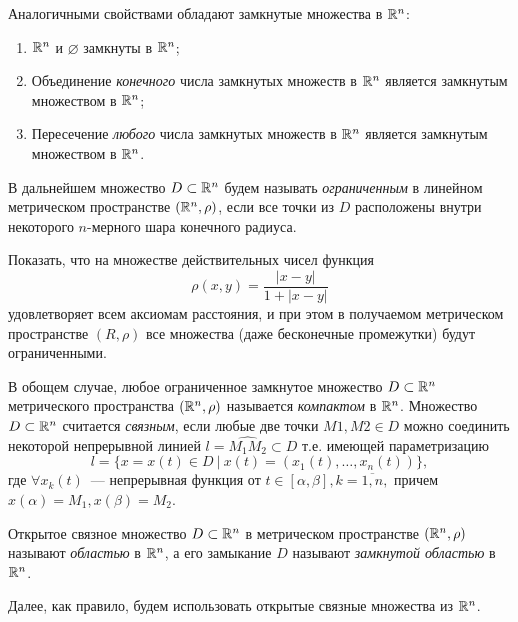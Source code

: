 \documentclass[../../main.tex]{subfiles}
\begin{document}
  Аналогичными свойствами обладают замкнутые множества в $\mathbb{R}^n$:
  \begin{enumerate}
    \item  $\mathbb{R}^n$  и $\varnothing$ замкнуты в $\mathbb{R}^n$;
    \item Объединение \emph{конечного}  числа замкнутых множеств в 
    $\mathbb{R}^n$ является замкнутым множеством в $\mathbb{R}^n$; 
    \item Пересечение \emph{любого} числа замкнутых множеств в $\mathbb{R}^n$ 
    является замкнутым множеством в $\mathbb{R}^n$.
  \end{enumerate} 
  
  
  В дальнейшем множество $D \subset \mathbb{R}^n$ будем называть 
  \emph{ограниченным} в линейном метрическом пространстве $ (\mathbb{R}^n, \rho) $, 
  если все точки из $D$ расположены внутри некоторого $n$-мерного шара 
  конечного радиуса.
  
  \begin{exc}
    Показать, что на множестве действительных чисел функция 
    \[ 
      \rho(x, y) = \frac{|x - y|}{1 + |x - y|}
    \] удовлетворяет всем аксиомам расстояния, и при этом в 
    получаемом метрическом пространстве $ (R, \rho) $ все множества 
    (даже бесконечные промежутки) будут ограниченными.   
   \end{exc} 
 
  \smallskip   
  В обощем случае, любое ограниченное замкнутое множество $D \subset 
  \mathbb{R}^n$ метрического пространства $ (\mathbb{R}^n, \rho) $ называется 
  \emph{компактом} в $\mathbb{R}^n$.
  Множество $D \subset \mathbb{R}^n$ считается \emph{связным}, если любые две точки 
  $M1,M2 \in D $ можно соединить некоторой непрерывной линией $ l = 
  \widehat{M_1M_2} \subset D$  
  т.е. имеющей параметризацию
  \[
    l = \{x = x(t) \in D\ |\ x(t) = (x_1(t), \dots, x_n(t))\},
  \]
  где $\forall x_k(t)$~--- непрерывная функция от $t \in [\alpha, 
  \beta], k = \overline{1,n},$ причем $ x(\alpha) = M_1, x(\beta) = 
  M_2.$
   
  Открытое связное множество $D \subset \mathbb{R}^n$ в метрическом 
  пространстве $ (\mathbb{R}^n, \rho) $ называют \emph{областью} в $\mathbb{R}^n$, а 
  его замыкание $D$ называют \emph{замкнутой областью} в $\mathbb{R}^n$.
   
  Далее, как правило, будем использовать открытые связные множества 
  из $\mathbb{R}^n$.
  
\end{document}
